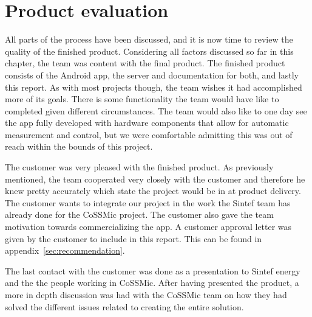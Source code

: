 \section{Product evaluation}
All parts of the process have been discussed, and it is now time to review the quality of the finished product. Considering all factors discussed so far in this chapter, the team was content with the final product. The finished product consists of the Android app, the server and documentation for both, and lastly this report. As with most projects though, the team wishes it had accomplished more of its goals. There is some functionality the team would have like to completed given different circumstances. The team would also like to one day see the app fully developed with hardware components that allow for automatic measurement and control, but we were comfortable admitting this was out of reach within the bounds of this project. 

The customer was very pleased with the finished product. As previously mentioned, the team cooperated very closely with the customer and therefore he knew pretty accurately which state the project would be in at product delivery. The customer wants to integrate our project in the work the Sintef team has already done for the CoSSMic project. The customer also gave the team motivation towards commercializing the app. A customer approval letter was given by the customer to include in this report. This can be found in appendix~\ref{sec:recommendation}.

The last contact with the customer was done as a presentation to Sintef energy and the the people working in CoSSMic. After having presented the product, a more in depth discussion was had with the CoSSMic team on how they had solved the different issues related to creating the entire solution. 
